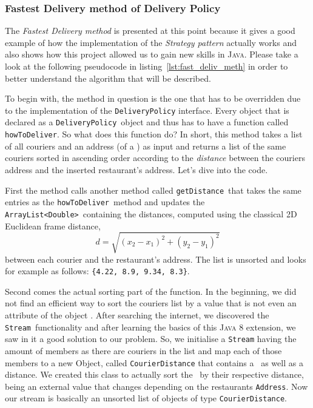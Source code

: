
\subsubsection{Fastest Delivery method of Delivery Policy} %
\label{ssub:fastest_delivery_method_of_delivery_policy}

The \emph{Fastest Delivery method} is presented at this point because it gives a good example
of how the implementation of the \emph{Strategy pattern} actually works
and also shows how this project allowed us to gain new skills in \textsc{Java}.
Please take a look at the following pseudocode in listing~\ref{lst:fast_deliv_meth}
in order to better understand the algorithm that will be described. 

To begin with, the method in question is the one that has to be overridden
due to the implementation of the \lstinline|DeliveryPolicy| interface.
Every object that is declared as a \lstinline|DeliveryPolicy|~object
and thus has to have a function called \lstinline|howToDeliver|. 
So what does this function do? In short, this method takes a list of all couriers
and an address (of a \Restaurant) as input and returns a list of the same couriers
sorted in ascending order according to the \emph{distance} between the couriers
address and the inserted restaurant's address. Let's dive into the code.

First the method calls another method called \lstinline|getDistance|~that
takes the same entries as the \lstinline|howToDeliver|~method and updates the
\lstinline|ArrayList<Double>|~containing the distances, computed using the
classical 2D Euclidean frame distance,
\[
  d = \sqrt{(x_2 - x_1)^2 + (y_2 - y_1)^2}
\]
between each courier and the restaurant's address. 
The list is unsorted and looks for example as follows: \lstinline|{4.22, 8.9, 9.34, 8.3}|. 

Second comes the actual sorting part of the function. In the beginning,
we did not find an efficient way to sort the couriers list by a value that is not
even an attribute of the object \Courier.
After searching the internet, we discovered the \lstinline|Stream|~functionality
and after learning the basics of this \textsc{Java 8} extension, we saw in it a good solution
to our problem. So, we initialise a \lstinline|Stream| having the amount of members as
there are couriers in the list and map each of those members to a new Object,
called \lstinline|CourierDistance| that contains a \Courier~as well as a distance.
We created this class to actually sort the \Courier~by their respective distance,
being an external value that changes depending on the restaurants \lstinline|Address|.
Now our stream is basically an unsorted list of objects of type \lstinline|CourierDistance|.

